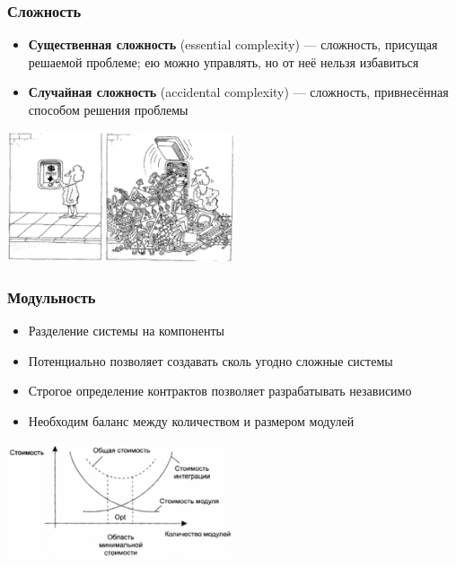 \documentclass{../../slides-style}
\begin{document}
    \begin{frame}[plain]
        \titlepage
    \end{frame}

    \begin{frame}
        \frametitle{Сложность}
        \begin{itemize}
            \item \textbf{Существенная сложность} (essential complexity) --- сложность, присущая решаемой проблеме; ею можно управлять, но от неё нельзя избавиться
            \item \textbf{Случайная сложность} (accidental complexity) --- сложность, привнесённая способом решения проблемы
        \end{itemize}
        \vskip 0.5cm
        \begin{center}
            \includegraphics[width=0.5\textwidth]{complexityHiding.png}
        \end{center}
    \end{frame}

    \begin{frame}
        \frametitle{Модульность}
        \begin{itemize}
            \item Разделение системы на компоненты
            \item Потенциально позволяет создавать сколь угодно сложные системы
            \item Строгое определение контрактов позволяет разрабатывать независимо
            \item Необходим баланс между количеством и размером модулей
        \end{itemize}
        \vskip 1cm
        \begin{center}
            \includegraphics[width=0.5\textwidth]{modulesCost.png}
        \end{center}
    \end{frame}
\end{document}
